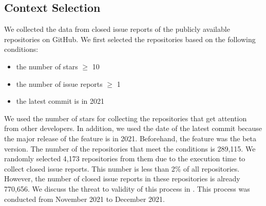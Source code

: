 \subsection{Context Selection}
We collected the data from closed issue reports of 
the publicly available repositories on GitHub. 
We first selected the repositories based on the following conditions:
\begin{itemize}
	\item the number of stars $\geq$ 10
	\item the number of issue reports $\geq$ 1
	\item the latest commit is in 2021
\end{itemize}
We used the number of stars for collecting the repositories 
that get attention from other developers. 
In addition, we used the date of the latest commit 
because the major release of the feature is in 2021. 
Beforehand, the feature was the beta version. 
The number of the repositories that meet 
the conditions is 289,115. 
We randomly selected 4,173 repositories from them 
due to the execution time to collect closed issue reports. 
This number is less than 2\% of all repositories. 
However, the number of closed issue reports
in these repositories is already 770,656. 
We discuss the threat to validity of 
this process in . 
This process was conducted from November 2021 to December 2021.



